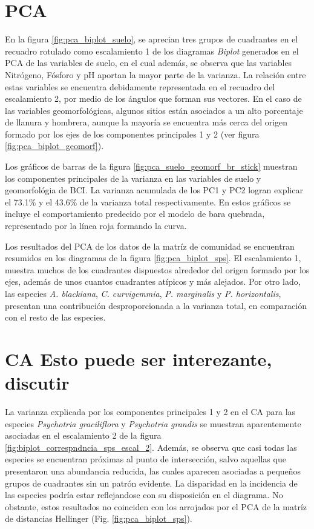 \documentclass[11pt,]{article}
\begin{document}
\section{PCA}\label{pca}

En la figura \ref{fig:pca_biplot_suelo}, se aprecian tres grupos de
cuadrantes en el recuadro rotulado como escalamiento 1 de los diagramas
\emph{Biplot} generados en el PCA de las variables de suelo, en el cual
además, se observa que las variables Nitrógeno, Fósforo y pH aportan la
mayor parte de la varianza. La relación entre estas variables se
encuentra debidamente representada en el recuadro del escalamiento 2,
por medio de los ángulos que forman sus vectores. En el caso de las
variables geomorfológicas, algunos sitios están asociados a un alto
porcentaje de llanura y hombrera, aunque la mayoría se encuentra más
cerca del origen formado por los ejes de los componentes principales 1 y
2 (ver figura \ref{fig:pca_biplot_geomorf}).

Los gráficos de barras de la figura \ref{fig:pca_suelo_geomorf_br_stick}
muestran los componentes principales de la varianza en las variables de
suelo y geomorfológia de BCI. La varianza acumulada de los PC1 y PC2
logran explicar el 73.1\% y el 43.6\% de la varianza total
respectivamente. En estos gráficos se incluye el comportamiento
predecido por el modelo de bara quebrada, representado por la línea roja
formando la curva.

Los resultados del PCA de los datos de la matríz de comunidad se
encuentran resumidos en los diagramas de la figura
\ref{fig:pca_biplot_sps}. El escalamiento 1, muestra muchos de los
cuadrantes dispuestos alrededor del origen formado por los ejes, además
de unos cuantos cuadrantes atípicos y más alejados. Por otro lado, las
especies \emph{A. blackiana}, \emph{C. curvigemmia}, \emph{P.
marginalis} y \emph{P. horizontalis}, presentan una contribución
desproporcionada a la varianza total, en comparación con el resto de las
especies.

\section{CA Esto puede ser interezante,
discutir}\label{ca-esto-puede-ser-interezante-discutir}

La varianza explicada por los componentes principales 1 y 2 en el CA
para las especies \emph{Psychotria graciliflora} y \emph{Psychotria
grandis} se muestran aparentemente asociadas en el escalamiento 2 de la
figura \ref{fig:biplot_correspndncia_sps_escal_2}. Además, se observa
que casi todas las especies se encuentran próximas al punto de
intersección, salvo aquellas que presentaron una abundancia reducida,
las cuales aparecen asociadas a pequeños grupos de cuadrantes sin un
patrón evidente. La disparidad en la incidencia de las especies podría
estar reflejandose con su disposición en el diagrama. No obstante, estos
resultados no coinciden con los arrojados por el PCA de la matríz de
distancias Hellinger (Fig. \ref{fig:pca_biplot_sps}).
\end{document}
